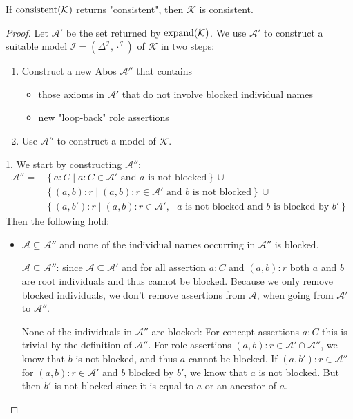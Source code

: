 \begin{lemma}[Soundness]
	If $\operatorname{\text{consistent}}(\mathcal{K})$ returns "consistent", then $\mathcal{K}$ is consistent.
\end{lemma}
\begin{proof}
	Let $\mathcal{A}'$ be the set returned by $\operatorname{\text{expand}}(\mathcal{K})$.
	We use $\mathcal{A}'$ to construct a suitable model $\mathcal{I} = (\Delta^\mathcal{I}, \cdot^\mathcal{I})$
	of $\mathcal{K}$ in two steps:
	\begin{enumerate}
		\item Construct a new Abos $\mathcal{A}''$ that contains
			\begin{itemize}
				\item those axioms in $\mathcal{A}'$ that do not involve blocked individual names
				\item new "loop-back" role assertions
			\end{itemize}
		\item Use $\mathcal{A}''$ to construct a model of $\mathcal{K}$.
	\end{enumerate}
	1. We start by constructing $\mathcal{A}''$:
	\begin{align*}
		\mathcal{A}'' = &\left\{ a:C \mid a:C \in \mathcal{A}' \text{ and $a$ is not blocked} \right\} \cup \\
						&\left\{ (a,b):r \mid (a,b):r \in \mathcal{A}' \text{ and $b$ is not blocked} \right\} \cup \\
						&\left\{ (a,b'):r \mid (a,b):r \in \mathcal{A}', \text{ $a$ is not blocked and $b$ is blocked by  $b'$} \right\}
	\end{align*}
	Then the following hold:
	\begin{itemize}
		\item $\mathcal{A} \subseteq \mathcal{A}''$ and none of the individual names occurring in $\mathcal{A}''$ is blocked.
			\begin{subproof}
				$\mathcal{A} \subseteq \mathcal{A}''$: since $\mathcal{A} \subseteq \mathcal{A}'$ and for all assertion
				$a:C$ and  $(a,b):r$ both $a$ and $b$ are root individuals
				and thus cannot be blocked.
				Because we only remove blocked individuals, we don't remove assertions from $\mathcal{A}$,
				when going from $\mathcal{A}'$ to $\mathcal{A}''$.

				None of the individuals in $\mathcal{A}''$ are blocked:
				For concept assertions $a:C$ this is trivial by the definition of $\mathcal{A}''$.
				For role assertions $(a,b):r \in \mathcal{A}' \cap \mathcal{A}''$, we know that $b$ is not blocked,
				and thus $a$ cannot be blocked.
				If $(a,b'):r \in \mathcal{A}''$ for $(a,b):r \in \mathcal{A}'$ and $b$ blocked by $b'$,
				we know that $a$ is not blocked.
				But then $b'$ is not blocked since it is equal to $a$ or an ancestor of $a$.
			\end{subproof}


\end{itemize}
\end{proof}
